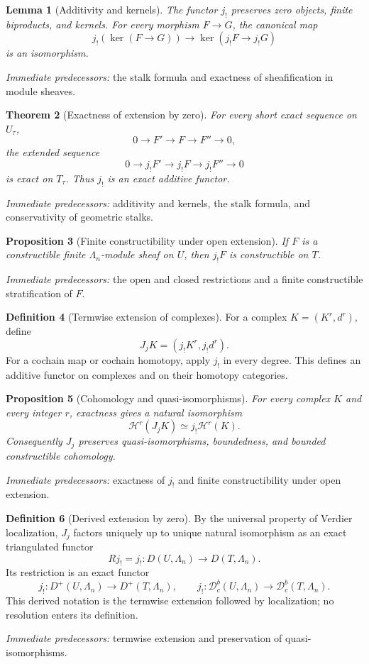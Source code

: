 \documentclass[10pt]{article}
\newtheorem{theorem}{Theorem}[section]
\newtheorem{proposition}[theorem]{Proposition}
\newtheorem{lemma}[theorem]{Lemma}
\theoremstyle{definition}
\newtheorem{definition}[theorem]{Definition}
\newcommand{\Dbc}{\mathcal D^b_c}
\newcommand{\pred}[1]{\par\smallskip\begingroup\footnotesize\raggedright
\emph{Immediate predecessors:} #1.\par\endgroup}
\begin{document}
\begin{lemma}[Additivity and kernels]
The functor \(j_!\) preserves zero objects, finite biproducts, and kernels.
For every morphism \(F\to G\), the canonical map
\[
 j_!(\ker(F\to G))\longrightarrow
 \ker(j_!F\to j_!G)
\]
is an isomorphism.
\end{lemma}
\pred{the stalk formula and exactness of sheafification in module sheaves}

\begin{theorem}[Exactness of extension by zero]
For every short exact sequence on \(U_\tau\),
\[
 0\longrightarrow F'\longrightarrow F\longrightarrow F''\longrightarrow0,
\]
the extended sequence
\[
 0\longrightarrow j_!F'\longrightarrow j_!F
 \longrightarrow j_!F''\longrightarrow0
\]
is exact on \(T_\tau\).  Thus \(j_!\) is an exact additive functor.
\end{theorem}
\pred{additivity and kernels, the stalk formula, and conservativity of geometric stalks}

\begin{proposition}[Finite constructibility under open extension]
If \(F\) is a constructible finite \(\Lambda_n\)-module sheaf on \(U\),
then \(j_!F\) is constructible on \(T\).
\end{proposition}
\pred{the open and closed restrictions and a finite constructible stratification of \(F\)}

\begin{definition}[Termwise extension of complexes]
For a complex \(K=(K^r,d^r)\), define
\[
 J_jK=(j_!K^r,j_!d^r).
\]
For a cochain map or cochain homotopy, apply \(j_!\) in every degree.
This defines an additive functor on complexes and on their homotopy
categories.
\end{definition}

\begin{proposition}[Cohomology and quasi-isomorphisms]
For every complex \(K\) and every integer \(r\), exactness gives a natural
isomorphism
\[
 \mathcal H^r(J_jK)\simeq j_!\mathcal H^r(K).
\]
Consequently \(J_j\) preserves quasi-isomorphisms, boundedness, and bounded
constructible cohomology.
\end{proposition}
\pred{exactness of \(j_!\) and finite constructibility under open extension}

\begin{definition}[Derived extension by zero]
By the universal property of Verdier localization, \(J_j\) factors uniquely
up to unique natural isomorphism as an exact triangulated functor
\[
 Rj_!=j_!:D(U,\Lambda_n)\longrightarrow D(T,\Lambda_n).
\]
Its restriction is an exact functor
\[
 j_!:D^+(U,\Lambda_n)\longrightarrow D^+(T,\Lambda_n),
\qquad
 j_!: \Dbc(U,\Lambda_n)\longrightarrow\Dbc(T,\Lambda_n).
\]
This derived notation is the termwise extension followed by localization;
no resolution enters its definition.
\end{definition}
\pred{termwise extension and preservation of quasi-isomorphisms}
\end{document}
